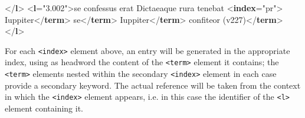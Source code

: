 \documentclass[11pt,twoside]{article}\makeatletter
\begin{document}
\begin{shaded}
\mbox{}\newline 
{</\textbf{l}>}\mbox{}\newline 
{<\textbf{l}\hspace*{6pt}{n}="{3.002}">}se confessus erat Dictaeaque rura tenebat\mbox{}\newline 
{<\textbf{index}\hspace*{6pt}{indexName}="{pr}">}\mbox{}\newline 
\hspace*{6pt}Iuppiter{</\textbf{term}>}\mbox{}\newline 
\hspace*{6pt}\mbox{}\newline 
\hspace*{6pt}\hspace*{6pt}se{</\textbf{term}>}\mbox{}\newline 
\hspace*{6pt}\mbox{}\newline 
{}\mbox{}\newline 
{}\mbox{}\newline 
\hspace*{6pt}Iuppiter{</\textbf{term}>}\mbox{}\newline 
\hspace*{6pt}\mbox{}\newline 
\hspace*{6pt}\hspace*{6pt}confiteor (v227){</\textbf{term}>}\mbox{}\newline 
\hspace*{6pt}\mbox{}\newline 
{}\mbox{}\newline 
{</\textbf{l}>}\end{shaded}\egroup\par \noindent  For each \texttt{<index>} element above, an entry will be generated in the appropriate index, using as headword the content of the \texttt{<term>} element it contains; the \texttt{<term>} elements nested within the secondary \texttt{<index>} element in each case provide a secondary keyword. The actual reference will be taken from the context in which the \texttt{<index>} element appears, i.e. in this case the identifier of the \texttt{<l>} element containing it.
\end{document}
